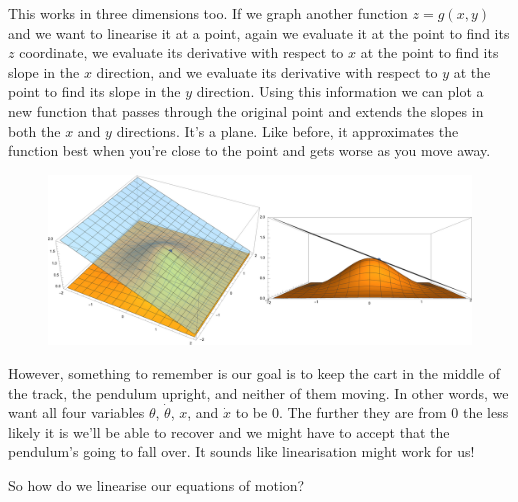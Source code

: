 \documentclass{article}
\begin{document}
This works in three dimensions too. If we graph another function $z = g(x, y)$ and we want to linearise it at a point, again we evaluate it at the point to find its $z$ coordinate, we evaluate its derivative with respect to $x$ at the point to find its slope in the $x$ direction, and we evaluate its derivative with respect to $y$ at the point to find its slope in the $y$ direction. Using this information we can plot a new function that passes through the original point and extends the slopes in both the $x$ and $y$ directions. It's a plane. Like before, it approximates the function best when you're close to the point and gets worse as you move away.

\begin{figure}[H]
  \centering
  \includegraphics[width=\textwidth]{linearisation2}
\end{figure}

However, something to remember is our goal is to keep the cart in the middle of the track, the pendulum upright, and neither of them moving. In other words, we want all four variables $\theta$, $\dot{\theta}$, $x$, and $\dot{x}$ to be $0$. The further they are from $0$ the less likely it is we'll be able to recover and we might have to accept that the pendulum's going to fall over. It sounds like linearisation might work for us!

So how do we linearise our equations of motion?
\end{document}
